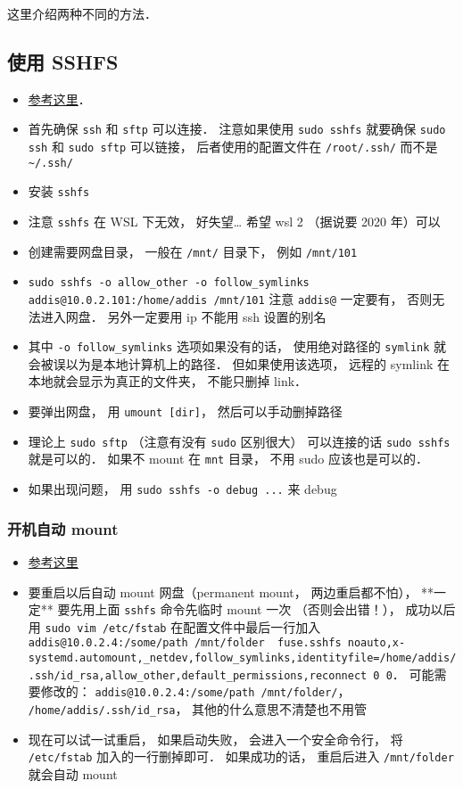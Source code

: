 
这里介绍两种不同的方法．

\subsection{使用 SSHFS}
\begin{itemize}
\item \href{https://www.digitalocean.com/community/tutorials/how-to-use-sshfs-to-mount-remote-file-systems-over-ssh}{参考这里}．
\item 首先确保 \verb`ssh` 和 \verb|sftp| 可以连接． 注意如果使用 \verb|sudo sshfs| 就要确保 \verb|sudo ssh| 和 \verb|sudo sftp| 可以链接， 后者使用的配置文件在 \verb|/root/.ssh/| 而不是 \verb|~/.ssh/|
\item 安装 \verb`sshfs`
\item 注意 \verb`sshfs` 在 WSL 下无效， 好失望… 希望 wsl 2 （据说要 2020 年）可以
\item 创建需要网盘目录， 一般在 \verb`/mnt/` 目录下， 例如 \verb`/mnt/101`
\item \verb`sudo sshfs -o allow_other -o follow_symlinks addis@10.0.2.101:/home/addis /mnt/101` 注意 \verb`addis@` 一定要有， 否则无法进入网盘． 另外一定要用 ip 不能用 ssh 设置的别名
\item 其中 \verb|-o follow_symlinks| 选项如果没有的话， 使用绝对路径的 \verb|symlink| 就会被误以为是本地计算机上的路径． 但如果使用该选项， 远程的 symlink 在本地就会显示为真正的文件夹， 不能只删掉 link．
\item 要弹出网盘， 用 \verb`umount [dir]`， 然后可以手动删掉路径
\item 理论上 \verb|sudo sftp| （注意有没有 \verb|sudo| 区别很大） 可以连接的话 \verb|sudo sshfs| 就是可以的． 如果不 mount 在 \verb|mnt| 目录， 不用 sudo 应该也是可以的．
\item 如果出现问题， 用 \verb|sudo sshfs -o debug ...| 来 debug
\end{itemize}

\subsubsection{开机自动 mount}
\begin{itemize}
\item \href{https://www.linode.com/docs/networking/ssh/using-sshfs-on-linux/}{参考这里}
\item 要重启以后自动 mount 网盘（permanent mount， 两边重启都不怕）， **一定** 要先用上面 \verb`sshfs` 命令先临时 mount 一次 （否则会出错！）， 成功以后用 \verb`sudo vim /etc/fstab` 在配置文件中最后一行加入 \verb`addis@10.0.2.4:/some/path /mnt/folder  fuse.sshfs noauto,x-systemd.automount,_netdev,follow_symlinks,identityfile=/home/addis/.ssh/id_rsa,allow_other,default_permissions,reconnect 0 0`． 可能需要修改的： \verb`addis@10.0.2.4:/some/path /mnt/folder/`， \verb`/home/addis/.ssh/id_rsa`， 其他的什么意思不清楚也不用管
\item 现在可以试一试重启， 如果启动失败， 会进入一个安全命令行， 将 \verb`/etc/fstab` 加入的一行删掉即可． 如果成功的话， 重启后进入 \verb`/mnt/folder` 就会自动 mount
\end{itemize}

